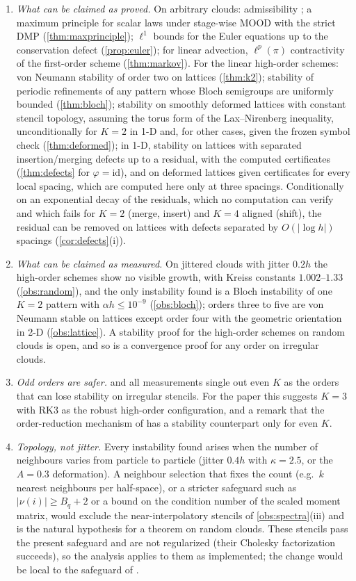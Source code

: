 \documentclass[11pt,a4paper]{article}
\theoremstyle{plain}
\theoremstyle{definition}
\theoremstyle{remark}
\numberwithin{equation}{section}
\newcommand{\nb}{\nu}
\newcommand{\A}[1]{\cite[#1]{Addendum}}
\begin{document}
\begin{enumerate}[label=(\arabic*)]
\item \emph{What can be claimed as proved.} On arbitrary clouds: admissibility \A{Thm.~6.3}; a maximum principle for scalar laws under stage-wise MOOD with the strict DMP (\cref{thm:maxprinciple}); $\ell^1$ bounds for the Euler equations up to the conservation defect (\cref{prop:euler}); for linear advection, $\ell^p(\pi)$ contractivity of the first-order scheme (\cref{thm:markov}). For the linear high-order schemes: von Neumann stability of order two on lattices (\cref{thm:k2}); stability of periodic refinements of any pattern whose Bloch semigroups are uniformly bounded (\cref{thm:bloch}); stability on smoothly deformed lattices with constant stencil topology, assuming the torus form of the Lax--Nirenberg inequality, unconditionally for $K=2$ in 1-D and, for other cases, given the frozen symbol check (\cref{thm:deformed}); in 1-D, stability on lattices with separated insertion/merging defects up to a residual, with the computed certificates (\cref{thm:defects} for $\varphi=\mathrm{id}$), and on deformed lattices given certificates for every local spacing, which are computed here only at three spacings. Conditionally on an exponential decay of the residuals, which no computation can verify and which fails for $K=2$ (merge, insert) and $K=4$ aligned (shift), the residual can be removed on lattices with defects separated by $O(|\log h|)$ spacings (\cref{cor:defects}(i)).
\item \emph{What can be claimed as measured.} On jittered clouds with jitter $0.2h$ the high-order schemes show no visible growth, with Kreiss constants $1.002$--$1.33$ (\cref{obs:random}), and the only instability found is a Bloch instability of one $K=2$ pattern with $\alpha h\le10^{-9}$ (\cref{obs:bloch}); orders three to five are von Neumann stable on lattices except order four with the geometric orientation in 2-D (\cref{obs:lattice}). A stability proof for the high-order schemes on random clouds is open, and so is a convergence proof for any order on irregular clouds.
\item \emph{Odd orders are safer.}  and all measurements single out even $K$ as the orders that can lose stability on irregular stencils. For the paper this suggests $K=3$ with RK3 as the robust high-order configuration, and a remark that the order-reduction mechanism of \A{Prop.~4.3} has a stability counterpart only for even $K$.
\item \emph{Topology, not jitter.} Every instability found arises when the number of neighbours varies from particle to particle (jitter $0.4h$ with $\kappa=2.5$, or the $A=0.3$ deformation). A neighbour selection that fixes the count (e.g.\ $k$ nearest neighbours per half-space), or a stricter safeguard such as $|\nb(i)|\ge B_q+2$ or a bound on the condition number of the scaled moment matrix, would exclude the near-interpolatory stencils of \cref{obs:spectra}(iii) and is the natural hypothesis for a theorem on random clouds. These stencils pass the present safeguard and are not regularized (their Cholesky factorization succeeds), so the analysis applies to them as implemented; the change would be local to the safeguard of \A{Rem.~3.10}.

\end{enumerate}
\end{document}
